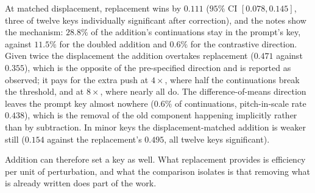 \documentclass{article}
\begin{document}
At matched displacement, replacement wins by $0.111$ ($95\%$ CI $[0.078,0.145]$, three
of twelve keys individually significant after correction), and the notes show the
mechanism: $28.8\%$ of the addition's continuations stay in the prompt's key, against
$11.5\%$ for the doubled addition and $0.6\%$ for the contrastive direction. Given
twice the displacement the addition overtakes replacement ($0.471$ against $0.355$),
which is the opposite of the pre-specified direction and is reported as observed; it
pays for the extra push at $4\times$, where half the continuations break the
threshold, and at $8\times$, where nearly all do. The difference-of-means direction leaves
the prompt key almost nowhere ($0.6\%$ of continuations, pitch-in-scale rate $0.438$), which
is the removal of the old component happening implicitly rather than by subtraction. In
minor keys the displacement-matched addition is weaker still ($0.154$ against the
replacement's $0.495$,
all twelve keys significant).

Addition can therefore set a key as well. What replacement provides is efficiency per
unit of perturbation, and what the comparison isolates is that removing what is already
written does part of the work.
\end{document}
